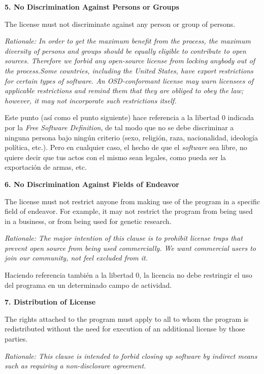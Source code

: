 {\bf 5. No Discrimination Against Persons or Groups

The license must not discriminate against any person or group of persons.}

\textit{Rationale: In order to get the maximum benefit from the process, the
maximum diversity of persons and groups should be equally eligible to contribute
to open sources. Therefore we forbid any open-source license from locking
anybody out of the process.\newline Some countries, including the United States,
have export restrictions for certain types of software. An OSD-conformant
license may warn licensees of applicable restrictions and remind them that they
are obliged to obey the law; however, it may not incorporate such restrictions
itself.}\newline

Este punto (así como el punto siguiente) hace referencia a la libertad 0
indicada por la \textit{Free Software Definition}, de tal modo que no se debe
discriminar a ninguna persona bajo ningún criterio (sexo, religión, raza,
nacionalidad, ideología política, etc.). Pero en cualquier caso, el hecho de que
el \textit{software} sea libre, no quiere decir que tus actos con el mismo sean
legales, como pueda ser la exportación de armas, etc.\newline

{\bf 6. No Discrimination Against Fields of Endeavor

The license must not restrict anyone from making use of the program in a
specific field of endeavor. For example, it may not restrict the program from
being used in a business, or from being used for genetic research.}

\textit{Rationale: The major intention of this clause is to prohibit license
traps that prevent open source from being used commercially. We want commercial
users to join our community, not feel excluded from it.}\newline

Haciendo referencia también a la libertad 0, la licencia no debe restringir el
uso del programa en un determinado campo de actividad.\newline

{\bf 7. Distribution of License

The rights attached to the program must apply to all to whom the program is
redistributed without the need for execution of an additional license by those
parties.}

\textit{Rationale: This clause is intended to forbid closing up software by
indirect means such as requiring a non-disclosure agreement.}\newline

